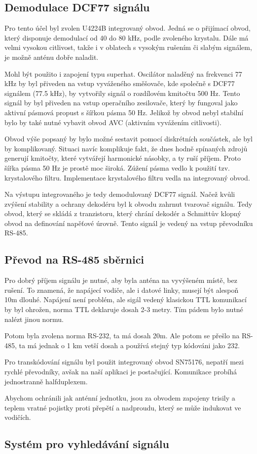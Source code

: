 \subsection{Demodulace DCF77 signálu}
    Pro tento účel byl zvolen U4224B integrovaný obvod. Jedná se o přijímací obvod, který
    disponuje demodulací od 40 do 80 kHz, podle zvoleného krystalu. Dále má velmi vysokou
    citlivost, takže i v oblatech s vysokým rušením či slabým signálem, je možně anténu
    dobře naladit.

    Mohl být použito i zapojení typu superhat. Oscilátor naladěný na frekvenci 77 kHz by
    byl přiveden na vstup vyváženého směšovače, kde společně s DCF77 signálem (77.5 kHz),
    by vytvořily signál o rozdílovém kmitočtu 500 Hz. Tento signál by byl přiveden na
    vstup operačního zesilovače, který by fungoval jako aktivní pásmová propust s šířkou
    pásma 50 Hz. Jelikož by obvod nebyl stabilní bylo by také nutné vybavit obvod AVC
    (aktivním vyvážením citlivosti).

    Obvod výše popsaný by bylo možné sestavit pomocí diskrétních součástek, ale byl by
    komplikovaný. Situaci navíc komplikuje fakt, že dnes hodně spínaných zdrojů generují
    kmitočty, které vytvářejí harmonické násobky, a ty ruší příjem. Proto šířka pásma 50
    Hz je prostě moc široká. Zúžení pásma vedlo k použití tzv. krystalového filtru.
    Implementace krystalového filtru vedla na integrovaný obvod.

    Na výstupu integrovaného je tedy demodulovaný DCF77 signál. Načež kvůli zvýšení
    stability a ochrany dekodéru byl k obvodu zahrnut tvarovač signálu. Tedy obvod, který
    se skládá z tranzistoru, který chrání dekodér a Schmittův klopný obvod na definování
    napěťové úrovně. Tento signál je vedený na vstup převodníku RS-485.

\subsection{Převod na RS-485 sběrnici}
    Pro dobrý příjem signálu je nutné, aby byla anténa na vyvýšeném místě, bez rušení.
    To znamená, že napájecí vodiče, ale i datové linky, musejí být alespoň 10m dlouhé.
    Napájení není problém, ale sigál vedený klasickou TTL komunikací by byl ohrožen,
    norma TTL deklaruje dosah 2-3 metry. Tím pádem bylo nutné nalézt jinou normu.

    Potom byla zvolena norma RS-232, ta má dosah 20m. Ale potom se přešlo na RS-485, ta má
    jednak o 1 km vetší dosah a používá stejný typ kódováni jako 232.

    Pro transkódování signálu byl použit integrovaný obvod SN75176, nepatří mezi rychlé
    převodníky, avšak na naší aplikaci je postačující. Komunikace probíhá jednostranně
    halfduplexem.

    Abychom ochránili jak anténní jednotku, jsou za obvodem zapojeny trisily a teplem
    vratné pojistky proti přepětí a nadproudu, který se může indukovat ve vodičích.

\subsection{Systém pro vyhledávání signálu}


